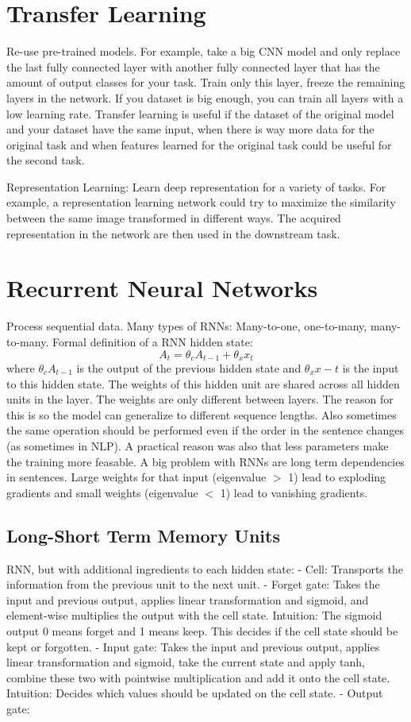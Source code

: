 \documentclass{scrartcl}
\begin{document}
\section*{Transfer Learning}
Re-use pre-trained models. For example, take a big CNN model and only replace the last fully connected layer with another fully connected layer that has the amount of output classes for your task. Train only this layer, freeze the remaining layers in the network. If you dataset is big enough, you can train all layers with a low learning rate.
Transfer learning is useful if the dataset of the original model and your dataset have the same input, when there is way more data for the original task and when features learned for the original task could be useful for the second task.

Representation Learning: Learn deep representation for a variety of tasks. For example, a representation learning network could try to maximize the similarity between the same image transformed in different ways. The acquired representation in the network are then used in the downstream task.


\section*{Recurrent Neural Networks}
Process sequential data.
Many types of RNNs: Many-to-one, one-to-many, many-to-many.
Formal definition of a RNN hidden state:
$$A_t = \theta_c A_{t-1} + \theta_x x_t$$
where $\theta_c A_{t-1}$ is the output of the previous hidden state and $\theta_x x-t$ is the input to this hidden state. The weights of this hidden unit are shared across all hidden units in the layer. The weights are only different between layers. The reason for this is so the model can generalize to different sequence lengths. Also sometimes the same operation should be performed even if the order in the sentence changes (as sometimes in NLP). A practical reason was also that less parameters make the training more feasable.
A big problem with RNNs are long term dependencies in sentences. Large weights for that input (eigenvalue $>$ 1) lead to exploding gradients and small weights (eigenvalue $<$ 1) lead to vanishing gradients.

\subsection*{Long-Short Term Memory Units}
RNN, but with additional ingredients to each hidden state:
- Cell: Transports the information from the previous unit to the next unit.
- Forget gate: Takes the input and previous output, applies linear transformation and sigmoid, and element-wise multiplies the output with the cell state. Intuition: The sigmoid output 0 means forget and 1 means keep. This decides if the cell state should be kept or forgotten.
- Input gate: Takes the input and previous output, applies linear transformation and sigmoid, take the current state and apply tanh, combine these two with pointwise multiplication and add it onto the cell state. Intuition: Decides which values should be updated on the cell state.
- Output gate:
\end{document}
